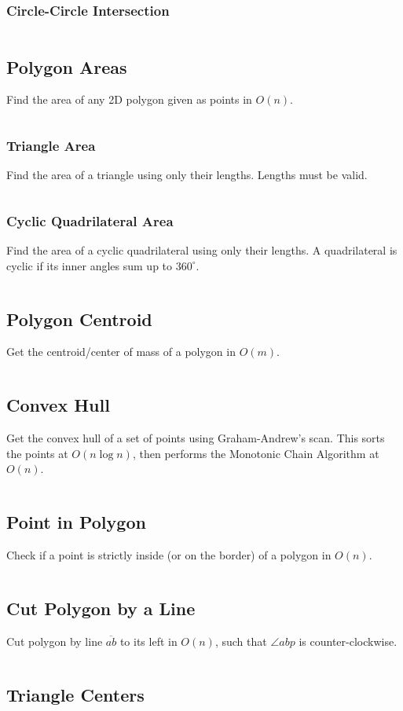 \documentclass[8pt,a4paper,landscape,oneside]{amsart}
\newcommand{\code}[1]{\inputminted[fontsize=\normalsize,baselinestretch=1]{cpp}{_code/#1}}
\begin{document}
\begin{multicols*}{3}
    \subsubsection{Circle-Circle Intersection}
      \code{geom/circ-circ-isect.cpp}
	\subsection{Polygon Areas}
    Find the area of any 2D polygon given as points in $O(n)$.
    \code{geom/poly-area.cpp}
    \subsubsection{Triangle Area}
      Find the area of a triangle using only their lengths. Lengths must be valid.
      \code{geom/tri-area.cpp}
    \subsubsection*{Cyclic Quadrilateral Area}
      Find the area of a cyclic quadrilateral using only their lengths. A quadrilateral is
      cyclic if its inner angles sum up to $360^\circ$.
      \code{geom/cyc-quad-area.cpp}
  \subsection{Polygon Centroid}
    Get the centroid/center of mass of a polygon in $O(m)$.
    \code{geom/poly-centroid.cpp}
  \subsection{Convex Hull}
    Get the convex hull of a set of points using Graham-Andrew's scan. This sorts the
    points at $O(n \log n)$, then performs the Monotonic Chain Algorithm at $O(n)$.
    \code{geom/convex-hull.cpp}
  \subsection{Point in Polygon}
    Check if a point is strictly inside (or on the border) of a polygon in $O(n)$.
    \code{geom/pt-in-poly.cpp}
  \subsection{Cut Polygon by a Line}
    Cut polygon by line $\overline{ab}$ to its left in $O(n)$, such that $\angle abp$ is counter-clockwise.
    \code{geom/cut-poly.cpp}
  \subsection{Triangle Centers}
    \code{geom/tri-centers.cpp}

\end{multicols*}
\end{document}
